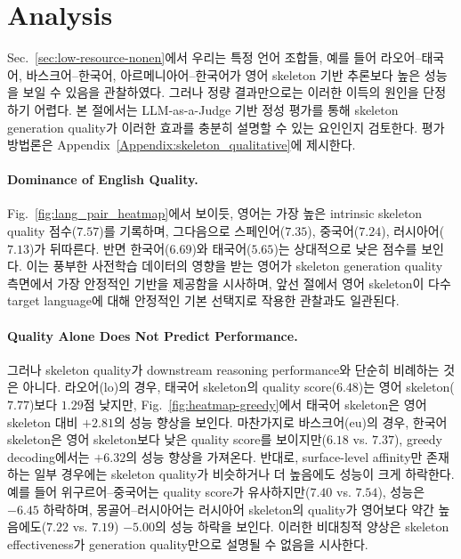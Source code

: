\section{Analysis}
\label{sec:analysis}

\noindent
Sec.~\ref{sec:low-resource-nonen}에서 우리는 특정 언어 조합들, 예를 들어 라오어--태국어, 바스크어--한국어, 아르메니아어--한국어가 영어 skeleton 기반 추론보다 높은 성능을 보일 수 있음을 관찰하였다. 그러나 정량 결과만으로는 이러한 이득의 원인을 단정하기 어렵다. 본 절에서는 LLM-as-a-Judge 기반 정성 평가를 통해 skeleton generation quality가 이러한 효과를 충분히 설명할 수 있는 요인인지 검토한다. 평가 방법론은 Appendix~\ref{Appendix:skeleton_qualitative}에 제시한다.




\paragraph{Dominance of English Quality.}
Fig.~\ref{fig:lang_pair_heatmap}에서 보이듯, 영어는 가장 높은 intrinsic skeleton quality 점수($7.57$)를 기록하며, 그다음으로 스페인어($7.35$), 중국어($7.24$), 러시아어($7.13$)가 뒤따른다. 반면 한국어($6.69$)와 태국어($5.65$)는 상대적으로 낮은 점수를 보인다. 이는 풍부한 사전학습 데이터의 영향을 받는 영어가 skeleton generation quality 측면에서 가장 안정적인 기반을 제공함을 시사하며, 앞선 절에서 영어 skeleton이 다수 target language에 대해 안정적인 기본 선택지로 작용한 관찰과도 일관된다.

\paragraph{Quality Alone Does Not Predict Performance.}
그러나 skeleton quality가 downstream reasoning performance와 단순히 비례하는 것은 아니다. 라오어(lo)의 경우, 태국어 skeleton의 quality score($6.48$)는 영어 skeleton($7.77$)보다 $1.29$점 낮지만, Fig.~\ref{fig:heatmap-greedy}에서 태국어 skeleton은 영어 skeleton 대비 $+2.81$의 성능 향상을 보인다. 마찬가지로 바스크어(eu)의 경우, 한국어 skeleton은 영어 skeleton보다 낮은 quality score를 보이지만($6.18$ vs. $7.37$), greedy decoding에서는 $+6.32$의 성능 향상을 가져온다. 반대로, surface-level affinity만 존재하는 일부 경우에는 skeleton quality가 비슷하거나 더 높음에도 성능이 크게 하락한다. 예를 들어 위구르어--중국어는 quality score가 유사하지만($7.40$ vs. $7.54$), 성능은 $-6.45$ 하락하며, 몽골어--러시아어는 러시아어 skeleton의 quality가 영어보다 약간 높음에도($7.22$ vs. $7.19$) $-5.00$의 성능 하락을 보인다. 이러한 비대칭적 양상은 skeleton effectiveness가 generation quality만으로 설명될 수 없음을 시사한다.

